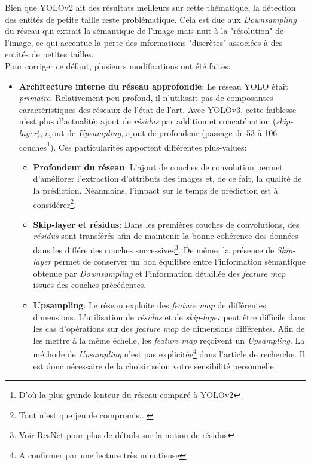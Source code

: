 \noindent Bien que YOLOv2 ait des résultats meilleurs sur cette thématique, la détection des entités de petite taille reste problématique. Cela est due aux \textit{Downsampling} du réseau qui extrait la sémantique de l'image mais nuit à la "résolution" de l'image, ce qui accentue la perte des informations "discrètes" associées à des entités de petites tailles.\\

\noindent Pour corriger ce défaut, plusieurs modifications ont été faites:
\begin{itemize}
    \item \textbf{Architecture interne du réseau approfondie}: Le réseau YOLO était \textit{primaire}. Relativement peu profond, il n'utilisait pas de composantes caractéristiques des réseaux de l'état de l'art. Avec YOLOv3, cette faiblesse n'est plus d'actualité: ajout de \textit{résidus} par addition et concaténation (\textit{skip-layer}), ajout de \textit{Upsampling}, ajout de profondeur (passage de 53 à 106 couches\footnote{D'où la plus grande lenteur du réseau comparé à YOLOv2}). Ces particularités apportent différentes plus-values:
    \begin{itemize}
        \item \textbf{Profondeur du réseau}: L'ajout de couches de convolution permet d'améliorer l'extraction d'attributs des images et, de ce fait, la qualité de la prédiction. Néanmoins, l'impact sur le temps de prédiction est à considérer\footnote{Tout n'est que jeu de compromis...}.

        \item \textbf{Skip-layer et résidus}: Dans les premières couches de convolutions, des \textit{résidus} sont transférés afin de maintenir la bonne cohérence des données dans les différentes couches successives\footnote{Voir ResNet pour plus de détails sur la notion de résidus}. De même, la présence de \textit{Skip-layer} permet de conserver un bon équilibre entre l'information sémantique obtenue par \textit{Downsampling} et l'information détaillée des \textit{feature map} issues des couches précédentes.

        \item \textbf{Upsampling}: Le réseau exploite des \textit{feature map} de différentes dimensions. L'utilisation de \textit{résidus} et de \textit{skip-layer} peut être difficile dans les cas d'opérations sur des \textit{feature map} de dimensions différentes. Afin de les mettre à la même échelle, les \textit{feature map} reçoivent un \textit{Upsampling}. La méthode de \textit{Upsampling} n'est pas explicitée\footnote{A confirmer par une lecture très minutieuse} dans l'article de recherche. Il est donc nécessaire de la choisir selon votre sensibilité personnelle.
    \end{itemize}


\end{itemize}

